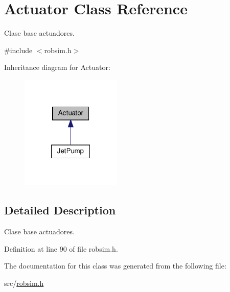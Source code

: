\hypertarget{classActuator}{}\section{Actuator Class Reference}
\label{classActuator}


Clase base actuadores.  




{\ttfamily \#include $<$robsim.\+h$>$}



Inheritance diagram for Actuator\+:\nopagebreak
\begin{figure}[H]
\begin{center}
\leavevmode
\includegraphics[width=136pt]{classActuator__inherit__graph}
\end{center}
\end{figure}


\subsection{Detailed Description}
Clase base actuadores. 

Definition at line 90 of file robsim.\+h.



The documentation for this class was generated from the following file\+:\begin{DoxyCompactItemize}
\item 
src/\hyperlink{robsim_8h}{robsim.\+h}\end{DoxyCompactItemize}
